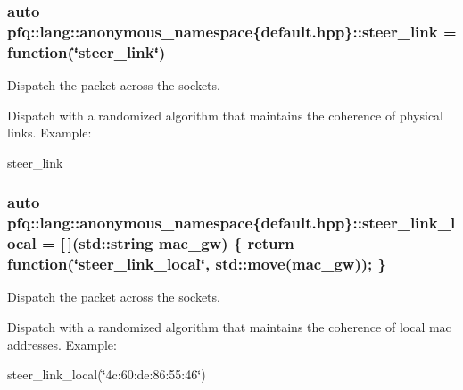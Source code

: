\subsubsection[{\texorpdfstring{steer\+\_\+link}{steer_link}}]{\setlength{\rightskip}{0pt plus 5cm}auto pfq\+::lang\+::anonymous\+\_\+namespace\{default.\+hpp\}\+::steer\+\_\+link = {\bf function}(\char`\"{}steer\+\_\+link\char`\"{})}\hypertarget{namespacepfq_1_1lang_1_1anonymous__namespace_02default_8hpp_03_ac1f3f9a2caf886a1441e62860a4ca058}{}\label{namespacepfq_1_1lang_1_1anonymous__namespace_02default_8hpp_03_ac1f3f9a2caf886a1441e62860a4ca058}


Dispatch the packet across the sockets. 

Dispatch with a randomized algorithm that maintains the coherence of physical links. Example\+:

steer\+\_\+link 
\subsubsection[{\texorpdfstring{steer\+\_\+link\+\_\+local}{steer_link_local}}]{\setlength{\rightskip}{0pt plus 5cm}auto pfq\+::lang\+::anonymous\+\_\+namespace\{default.\+hpp\}\+::steer\+\_\+link\+\_\+local = \mbox{[}$\,$\mbox{]}(std\+::string mac\+\_\+gw) \{ return {\bf function}(\char`\"{}steer\+\_\+link\+\_\+local\char`\"{}, std\+::move(mac\+\_\+gw)); \}}\hypertarget{namespacepfq_1_1lang_1_1anonymous__namespace_02default_8hpp_03_a6bcbd11933d00917b62ef72890a98c3c}{}\label{namespacepfq_1_1lang_1_1anonymous__namespace_02default_8hpp_03_a6bcbd11933d00917b62ef72890a98c3c}


Dispatch the packet across the sockets. 

Dispatch with a randomized algorithm that maintains the coherence of local mac addresses. Example\+:

steer\+\_\+link\+\_\+local(\char`\"{}4c\+:60\+:de\+:86\+:55\+:46\char`\"{}) 
